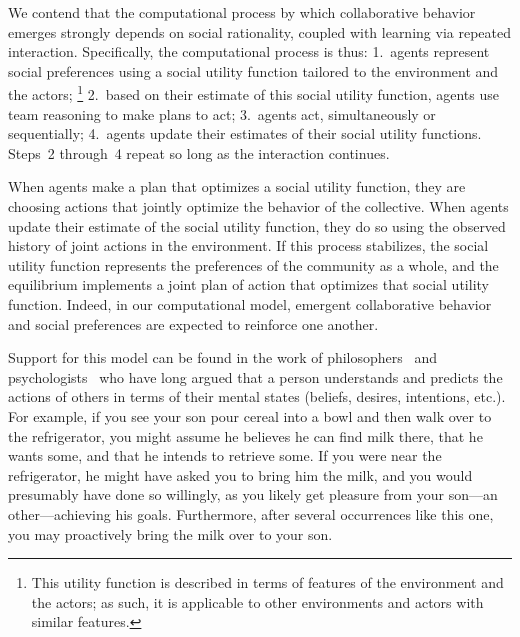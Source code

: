 We contend that the computational process by which collaborative
behavior emerges strongly depends on social rationality, coupled with
learning via repeated interaction.
%
Specifically, the computational process is thus:
1.~agents represent social preferences using a social utility function
tailored to the environment and the actors;%
\footnote{This utility function is described in terms of features of the environment and the actors;
as such, it is applicable to other environments and actors with similar features.}
2.~based on their estimate of this social utility function, agents use team reasoning to make plans to act;
3.~agents act, simultaneously or sequentially;
4.~agents update their estimates of their social utility functions.
Steps~2 through~4 repeat so long as the interaction continues.

When agents
make a plan that optimizes a social
utility function, they are choosing actions that jointly optimize the
behavior of the collective.
When agents update their estimate of the social utility function, they
do so using the observed history of joint actions in the environment.
If this process stabilizes, the social utility function represents the
preferences of the community as a whole, 
and the equilibrium implements a joint plan of action that optimizes
that social utility function.  Indeed, in our computational model,
emergent collaborative behavior and social preferences are expected to
reinforce one another.

Support for this model can be found in the work of
philosophers~\cite{dennett87} and psychologists~\cite{heider44} who
have long argued that a person understands and predicts the actions of
others in terms of their mental states (beliefs, desires, intentions,
etc.).  For example, if you see your son pour cereal into a bowl and
then walk over to the refrigerator, you might assume he believes he
can find milk there, that he wants some, and that he intends to
retrieve some.  If you were near the refrigerator, he might have asked
you to bring him the milk, and you would presumably have done so
willingly, as you likely get pleasure from your son---an
other---achieving his goals.  Furthermore, after several occurrences
like this one, you may proactively bring the milk over to your son.

